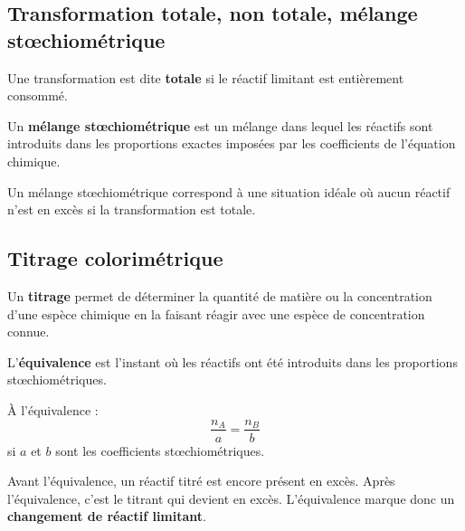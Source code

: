 \documentclass[11pt,a4paper]{article}
\begin{document}
\subsection{Transformation totale, non totale, mélange stœchiométrique}

\begin{definitionbox}
Une transformation est dite \textbf{totale} si le réactif limitant est entièrement consommé.
\end{definitionbox}

\begin{definitionbox}
Un \textbf{mélange stœchiométrique} est un mélange dans lequel les réactifs sont introduits dans les proportions exactes imposées par les coefficients de l'équation chimique.
\end{definitionbox}

\begin{sensbox}
Un mélange stœchiométrique correspond à une situation idéale où aucun réactif n'est en excès si la transformation est totale.
\end{sensbox}

\subsection{Titrage colorimétrique}

\begin{definitionbox}
Un \textbf{titrage} permet de déterminer la quantité de matière ou la concentration d'une espèce chimique en la faisant réagir avec une espèce de concentration connue.
\end{definitionbox}

\begin{definitionbox}
L'\textbf{équivalence} est l'instant où les réactifs ont été introduits dans les proportions stœchiométriques.
\end{definitionbox}

\begin{proprbox}
À l'équivalence :
\[
\frac{n_A}{a}=\frac{n_B}{b}
\]
si \(a\) et \(b\) sont les coefficients stœchiométriques.
\end{proprbox}

\begin{sensbox}
Avant l'équivalence, un réactif titré est encore présent en excès.  
Après l'équivalence, c'est le titrant qui devient en excès.  
L'équivalence marque donc un \textbf{changement de réactif limitant}.
\end{sensbox}
\end{document}
